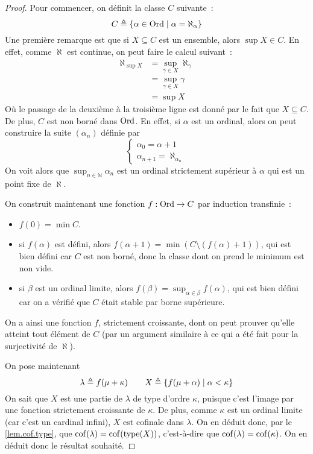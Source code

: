 \begin{proof}
  Pour commencer, on définit la classe $C$ suivante~:
  \[C \triangleq \{\alpha \in \operatorname{Ord}\mid \alpha = \aleph_\alpha\}\]
  Une première remarque est que si $X\subseteq C$ est un ensemble, alors
  $\sup X \in C$. En effet, comme $\aleph$ est continue, on peut faire le calcul
  suivant~:
  \begin{align*}
    \aleph_{\sup X} &= \sup_{\gamma \in X} \aleph_\gamma\\
    &= \sup_{\gamma \in X} \gamma\\
    &= \sup X
  \end{align*}
  Où le passage de la deuxième à la troisième ligne est donné par le fait que
  $X\subseteq C$. De plus, $C$ est non borné dans $\operatorname{Ord}$. En effet, si $\alpha$
  est un ordinal, alors on peut construire la suite $(\alpha_n)$ définie par
  \[\left\{\begin{array}{c}
  \alpha_0 = \alpha + 1\\
  \alpha_{n+1} = \aleph_{\alpha_n}
  \end{array}\right.\]
  On voit alors que $\sup_{n \in \mathbb N} \alpha_n$ est un ordinal strictement
  supérieur à $\alpha$ qui est un point fixe de $\aleph$.

  On construit maintenant une fonction $f : \operatorname{Ord} \to C$ par induction
  transfinie~:
  \begin{itemize}
  \item $f(0) = \min C$.
  \item si $f(\alpha)$ est défini, alors
    $f(\alpha + 1) = \min(C \setminus (f(\alpha) + 1))$, qui est bien défini car
    $C$ est non borné, donc la classe dont on prend le minimum est non vide.
  \item si $\beta$ est un ordinal limite, alors
    $f(\beta) = \sup_{\alpha \in \beta} f(\alpha)$, qui est bien défini car
    on a vérifié que $C$ était stable par borne supérieure.
  \end{itemize}
  On a ainsi une fonction $f$, strictement croissante, dont on peut prouver
  qu'elle atteint tout élément de $C$ (par un argument similaire à ce qui a été
  fait pour la surjectivité de $\aleph$).

  On pose maintenant
  \[\lambda \triangleq f(\mu + \kappa)\qquad
  X \triangleq \{f(\mu + \alpha)\mid \alpha < \kappa\}\]
  On sait que $X$ est une partie de $\lambda$ de type d'ordre $\kappa$, puisque
  c'est l'image par une fonction strictement croissante de $\kappa$. De plus,
  comme $\kappa$ est un ordinal limite (car c'est un cardinal infini), $X$ est
  cofinale dans $\lambda$. On en déduit donc, par le \cref{lem.cof.type}, que
  $\operatorname{cof}(\lambda) = \operatorname{cof}(\operatorname{type}(X))$, c'est-à-dire que
  $\operatorname{cof}(\lambda) = \operatorname{cof}(\kappa)$. On en déduit donc le résultat souhaité.
\end{proof}

